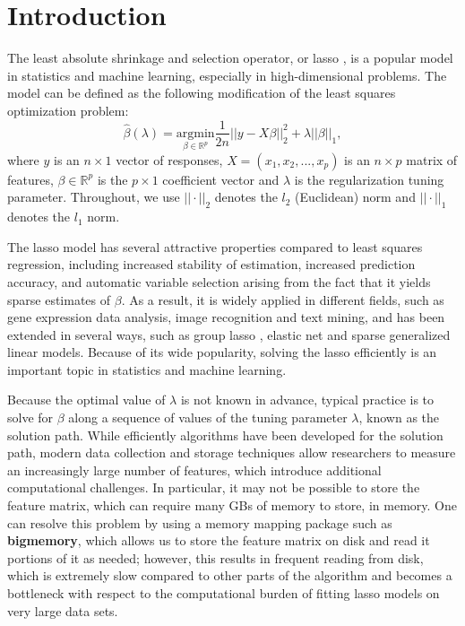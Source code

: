 \section{Introduction}

The least absolute shrinkage and selection operator, or lasso \citep{tibshirani1996regression}, is a popular model in statistics and machine learning, especially in high-dimensional problems. The model can be defined as the following modification of the least squares optimization problem:
\begin{equation}
  \label{eq:lasso}
  \hat{\beta}(\lambda)=\underset{\beta\in \mathbb{R}^p}{\mathrm{argmin}}\frac{1}{2n}||y-X\beta||_2^2+\lambda||\beta||_1,
\end{equation}
where $y$ is an $n\times 1$ vector of responses, $X=(x_1,x_2,...,x_p)$ is an $n\times p$ matrix of features, $\beta\in \mathbb{R}^p$ is the $p\times 1$ coefficient vector and $\lambda$ is the regularization tuning parameter. Throughout, we use $||\cdot||_2$ denotes the $l_2$ (Euclidean) norm and $||\cdot||_1$ denotes the $l_1$ norm. 

The lasso model has several attractive properties compared to least squares regression, including increased stability of estimation, increased prediction accuracy, and automatic variable selection arising from the fact that it yields sparse estimates of $\beta$.  As a result, it is widely applied in different fields, such as gene expression data analysis, image recognition and text mining, and has been extended in several ways, such as group lasso \citep{yuan2006model}, elastic net \citep{zou2005regularization} and sparse generalized linear models. Because of its wide popularity, solving the lasso efficiently is an important topic in statistics and machine learning.

Because the optimal value of $\lambda$ is not known in advance, typical practice is to solve for $\beta$ along a sequence of values of the tuning parameter $\lambda$, known as the solution path. While efficiently algorithms have been developed \citep{friedman2007pathwise} for the solution path, modern data collection and storage techniques allow researchers to measure an increasingly large number of features, which introduce additional computational challenges. In particular, it may not be possible to store the feature matrix, which can require many GBs of memory to store, in memory. One can resolve this problem by using a memory mapping package such as \textbf{bigmemory}, which allows us to store the feature matrix on disk and read it portions of it as needed; however, this results in frequent reading from disk, which is extremely slow compared to other parts of the algorithm and becomes a bottleneck with respect to the computational burden of fitting lasso models on very large data sets.

